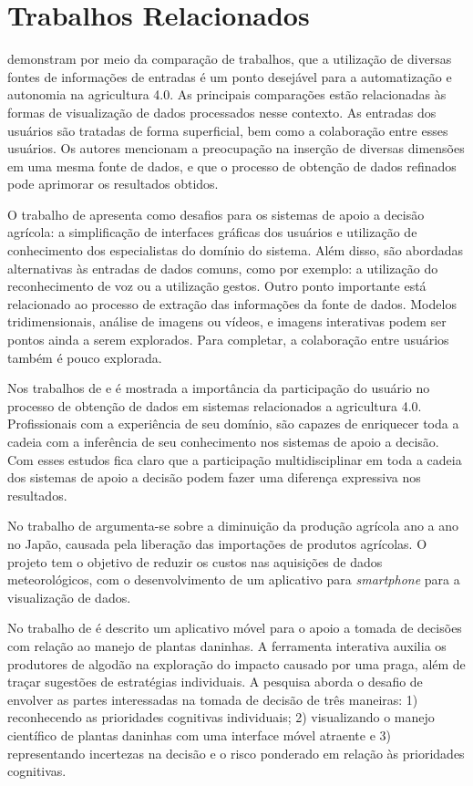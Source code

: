\documentclass[12pt]{article}
\begin{document}
\section{Trabalhos Relacionados}
\label{sec:trabalhos_relacionados}

 demonstram por meio da comparação de trabalhos, que a utilização de diversas fontes de informações de entradas é um ponto desejável para a automatização e autonomia na agricultura 4.0. As principais comparações estão relacionadas às formas de visualização de dados processados nesse contexto. As entradas dos usuários são tratadas de forma superficial, bem como a colaboração entre esses usuários. Os autores mencionam a preocupação na inserção de diversas dimensões em uma mesma fonte de dados, e que o processo de obtenção de dados refinados pode aprimorar os resultados obtidos.

O trabalho de  apresenta como desafios para os sistemas de apoio a decisão agrícola: a simplificação de interfaces gráficas dos usuários e utilização de conhecimento dos especialistas do domínio do sistema. Além disso, são abordadas alternativas às entradas de dados comuns, como por exemplo: a utilização do reconhecimento de voz ou a utilização gestos. Outro ponto importante está relacionado ao processo de extração das informações da fonte de dados. Modelos tridimensionais, análise de imagens ou vídeos, e imagens interativas podem ser pontos ainda a serem explorados. Para completar, a colaboração entre usuários também é pouco explorada.

Nos trabalhos de  e  é mostrada a importância da participação do usuário no processo de obtenção de dados em sistemas relacionados a agricultura 4.0. Profissionais com a experiência de seu domínio, são capazes de enriquecer toda a cadeia com a inferência de seu conhecimento nos sistemas de apoio a decisão. Com esses estudos fica claro que a participação multidisciplinar em toda a cadeia dos sistemas de apoio a decisão podem fazer uma diferença expressiva nos resultados.

No trabalho de  argumenta-se sobre a diminuição da produção agrícola ano a ano no Japão, causada pela liberação das importações de produtos agrícolas. O projeto tem o objetivo de reduzir os custos nas aquisições de dados meteorológicos, com o desenvolvimento de um aplicativo para \textit{smartphone} para a visualização de dados.

No trabalho de  é descrito um aplicativo móvel para o apoio a tomada de decisões com relação ao manejo de plantas daninhas. A ferramenta interativa auxilia os produtores de algodão na exploração do impacto causado por uma praga, além de traçar sugestões de estratégias individuais. A pesquisa aborda o desafio de envolver as partes interessadas na tomada de decisão de três maneiras: 1) reconhecendo as prioridades cognitivas individuais; 2) visualizando o manejo científico de plantas daninhas com uma interface móvel atraente e 3) representando incertezas na decisão e o risco ponderado em relação às prioridades cognitivas.
\end{document}
